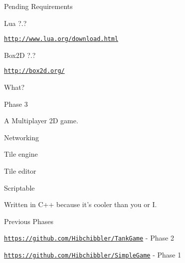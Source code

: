 Pending Requirements
\begin{DoxyItemize}
\item Lua ?.?
\begin{DoxyItemize}
\item \href{http://www.lua.org/download.html}{\tt http\-://www.\-lua.\-org/download.\-html}
\end{DoxyItemize}
\item Box2\-D ?.?
\begin{DoxyItemize}
\item \href{http://box2d.org/}{\tt http\-://box2d.\-org/}
\end{DoxyItemize}
\end{DoxyItemize}

What?
\begin{DoxyItemize}
\item Phase 3
\item A Multiplayer 2\-D game.
\item Networking
\item Tile engine
\item Tile editor
\item Scriptable
\item Written in C++ because it's cooler than you or I.
\item Previous Phases
\begin{DoxyItemize}
\item \href{https://github.com/Hibchibbler/TankGame}{\tt https\-://github.\-com/\-Hibchibbler/\-Tank\-Game} -\/ Phase 2
\item \href{https://github.com/Hibchibbler/SimpleGame}{\tt https\-://github.\-com/\-Hibchibbler/\-Simple\-Game} -\/ Phase 1 
\end{DoxyItemize}
\end{DoxyItemize}